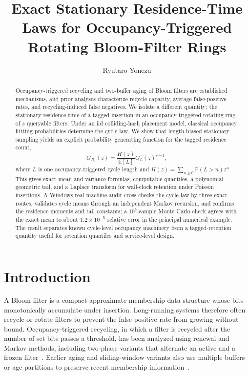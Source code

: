 \documentclass[11pt]{article}
\title{Exact Stationary Residence-Time Laws for Occupancy-Triggered Rotating Bloom-Filter Rings}
\author{Ryutaro Yonezu}
\date{}
\newcommand{\E}{\mathbb{E}}
\newcommand{\Prb}{\mathbb{P}}
\begin{document}
\maketitle

\begin{abstract}
Occupancy-triggered recycling and two-buffer aging of Bloom filters are established mechanisms, and prior analyses characterize recycle capacity, average false-positive rates, and recycling-induced false negatives. We isolate a different quantity: the stationary residence time of a tagged insertion in an occupancy-triggered rotating ring of $s$ queryable filters. Under an iid colliding-hash placement model, classical occupancy hitting probabilities determine the cycle law. We show that length-biased stationary sampling yields an explicit probability generating function for the tagged residence count,
\[
G_{R_s}(z)=\frac{H(z)}{\E[L]}G_L(z)^{s-1},
\]
where $L$ is one occupancy-triggered cycle length and $H(z)=\sum_{n\ge0}\Prb(L>n)z^n$. This gives exact mean and variance formulas, computable quantiles, a polynomial-geometric tail, and a Laplace transform for wall-clock retention under Poisson insertions. A Windows real-machine audit cross-checks the cycle law by three exact routes, validates cycle means through an independent Markov recursion, and confirms the residence moments and tail constants; a $10^5$-sample Monte Carlo check agrees with the exact mean to about $1.2\times10^{-5}$ relative error in the principal numerical example. The result separates known cycle-level occupancy machinery from a tagged-retention quantity useful for retention quantiles and service-level design.
\end{abstract}

\section{Introduction}
A Bloom filter is a compact approximate-membership data structure whose bits monotonically accumulate under insertion. Long-running systems therefore often recycle or rotate filters to prevent the false-positive rate from growing without bound. Occupancy-triggered recycling, in which a filter is recycled after the number of set bits passes a threshold, has been analyzed using renewal and Markov methods, including two-phase variants that alternate an active and a frozen filter~\cite{dozierfp2024,dozierfn2024}. Earlier aging and sliding-window variants also use multiple buffers or age partitions to preserve recent membership information~\cite{yoon2010,shtul2020}.
\end{document}
